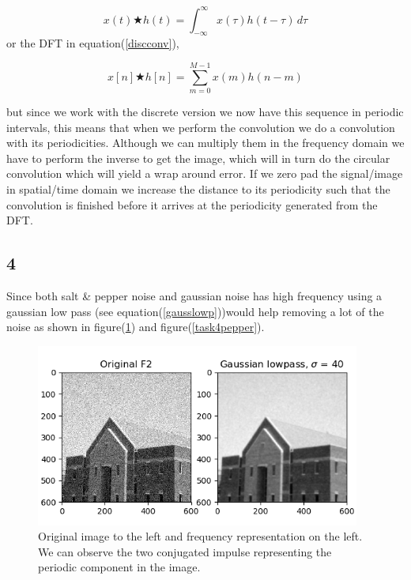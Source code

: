{\begin{equation}
    x(t) \bigstar h(t) = \int_{-\infty}^{\infty} x(\tau)h(t - \tau)\, d\tau
    \label{contconv}
\end{equation}
or the DFT in equation(\ref{discconv}),

\begin{equation}
    x[n] \bigstar h[n] = \sum_{m = 0}^{M-1} x(m)h(n - m)
    \label{discconv}
\end{equation}

but since we work with the discrete version we now have this sequence in periodic intervals, this means that when we perform the convolution we do a convolution with its periodicities. Although we can multiply them in the frequency domain we have to perform the inverse to get the image, which will in turn do the circular convolution which will yield a wrap around error. If we zero pad the signal/image in spatial/time domain we increase the distance to its periodicity such that the convolution is finished before it arrives at the periodicity generated from the DFT.


\subsection{4}

Since both salt \& pepper noise and gaussian noise has high frequency using a gaussian low pass (see equation(\ref{gausslowp}))would help removing a lot of the noise as shown in figure(\ref{task4gauss}) and figure(\ref{task4pepper}).

\begin{figure}[!htb]
    {\centering
        \includegraphics[width=0.95\textwidth]{task4gauss.png}
        \caption{Original image to the left and frequency representation on the left. We can observe the two conjugated impulse representing the periodic component in the image.}
        \label{task4gauss}
    \par}
    \end{figure}

}
